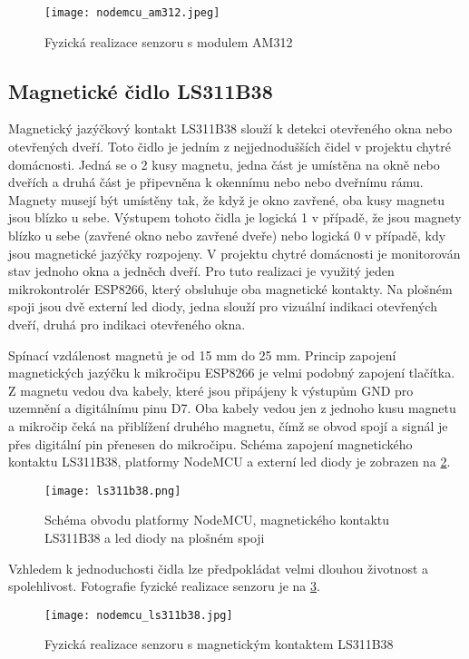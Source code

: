 \begin{figure}[H]
  \centering
  \texttt{[image: nodemcu\_am312.jpeg]}
  \caption{Fyzická realizace senzoru s modulem AM312}
  \label{fig:nodemcu_am312}
\end{figure} 

\subsection{Magnetické čidlo LS311B38}
Magnetický jazýčkový kontakt LS311B38 slouží k detekci otevřeného okna nebo otevřených dveří. Toto čidlo je jedním z nejjednodušších čidel v projektu chytré domácnosti. Jedná se o 2 kusy magnetu, jedna část je umístěna na okně nebo dveřích a druhá část je připevněna k okennímu nebo nebo \mbox{dveřnímu} rámu. Magnety musejí být umístěny tak, že když je okno zavřené, oba kusy magnetu jsou blízko u sebe. Výstupem tohoto čidla je logická 1 v případě, že jsou magnety blízko u sebe (zavřené okno nebo zavřené dveře) nebo logická 0 v případě, kdy jsou magnetické jazýčky rozpojeny. V projektu chytré domácnosti je monitorován stav jednoho okna a jedněch dveří. Pro tuto realizaci je využitý jeden mikrokontrolér ESP8266, který obsluhuje oba magnetické kontakty. Na plošném spoji jsou dvě externí led diody, jedna slouží pro vizuální indikaci otevřených dveří, druhá pro indikaci otevřeného okna. \par
Spínací vzdálenost magnetů je od 15 mm do 25 mm. Princip zapojení magnetických jazýčku k mikročipu ESP8266 je velmi podobný zapojení tlačítka. Z magnetu vedou dva kabely, které jsou připájeny k výstupům GND pro uzemnění a digitálnímu pinu D7. Oba kabely vedou jen z jednoho kusu magnetu a mikročip čeká na přiblížení druhého magnetu, čímž se obvod spojí a signál je přes digitální pin přenesen do mikročipu. Schéma zapojení magnetického kontaktu LS311B38, platformy NodeMCU a externí led diody je zobrazen na \cref{fig:schema_esp_ls311b38}.

\begin{figure}[H]
  \centering
  \texttt{[image: ls311b38.png]}
  \caption{Schéma obvodu platformy NodeMCU, magnetického kontaktu LS311B38 a led diody na plošném spoji}
  \label{fig:schema_esp_ls311b38}
\end{figure}

Vzhledem k jednoduchosti čidla lze předpokládat velmi dlouhou životnost a spolehlivost. Fotografie fyzické realizace senzoru je na \cref{fig:nodemcu_ls311b38}.

\begin{figure}[H]
  \centering
  \texttt{[image: nodemcu\_ls311b38.jpg]}
  \caption{Fyzická realizace senzoru s magnetickým kontaktem LS311B38}
  \label{fig:nodemcu_ls311b38}
\end{figure} 

